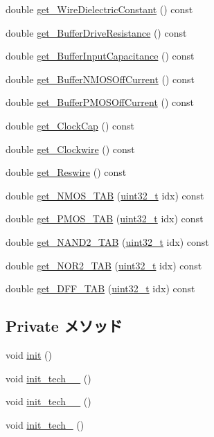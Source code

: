\begin{DoxyCompactItemize}
\item 
double \hyperlink{classTechParameter_af0f67ba9e156d60b46f1d83cc6d810d0}{get\_\-WireDielectricConstant} () const 
\item 
double \hyperlink{classTechParameter_afbf3915cdc33b808b8ad9c5afb71516a}{get\_\-BufferDriveResistance} () const 
\item 
double \hyperlink{classTechParameter_ac94ae59a7943a65a6e9868383e6bea27}{get\_\-BufferInputCapacitance} () const 
\item 
double \hyperlink{classTechParameter_aa1fbae5d74eb92a1a9c72a6fea9ca77f}{get\_\-BufferNMOSOffCurrent} () const 
\item 
double \hyperlink{classTechParameter_a30d0632ddefd780bb1bc6a0e9e5c0150}{get\_\-BufferPMOSOffCurrent} () const 
\item 
double \hyperlink{classTechParameter_afe4962e1a5669da514758a38434b84d8}{get\_\-ClockCap} () const 
\item 
double \hyperlink{classTechParameter_a013a3ecc42b046840eef9bef4c98081a}{get\_\-Clockwire} () const 
\item 
double \hyperlink{classTechParameter_a4f5da329c1d512ec23a66c4f0640fb9d}{get\_\-Reswire} () const 
\item 
double \hyperlink{classTechParameter_ad11303547538a05bd16a786162cf6f21}{get\_\-NMOS\_\-TAB} (\hyperlink{Type_8hh_a435d1572bf3f880d55459d9805097f62}{uint32\_\-t} idx) const 
\item 
double \hyperlink{classTechParameter_ac30923485e8060838bf0e23c152aa3d6}{get\_\-PMOS\_\-TAB} (\hyperlink{Type_8hh_a435d1572bf3f880d55459d9805097f62}{uint32\_\-t} idx) const 
\item 
double \hyperlink{classTechParameter_ad62c0a5630b13d0a9c4cbfe5bb9404d5}{get\_\-NAND2\_\-TAB} (\hyperlink{Type_8hh_a435d1572bf3f880d55459d9805097f62}{uint32\_\-t} idx) const 
\item 
double \hyperlink{classTechParameter_a88a118640a4fc2e7eba7825caebb6187}{get\_\-NOR2\_\-TAB} (\hyperlink{Type_8hh_a435d1572bf3f880d55459d9805097f62}{uint32\_\-t} idx) const 
\item 
double \hyperlink{classTechParameter_a34320956a27f781250cce6ad992d01d9}{get\_\-DFF\_\-TAB} (\hyperlink{Type_8hh_a435d1572bf3f880d55459d9805097f62}{uint32\_\-t} idx) const 
\end{DoxyCompactItemize}
\subsection*{Private メソッド}
\begin{DoxyCompactItemize}
\item 
void \hyperlink{classTechParameter_a02fd73d861ef2e4aabb38c0c9ff82947}{init} ()
\item 
void \hyperlink{classTechParameter_ac3246eb08ab7475baa739b641dbb3c92}{init\_\-tech\_\_} ()
\item 
void \hyperlink{classTechParameter_a2309fd1d1526cfd38d60ddb5f67b26c0}{init\_\-tech\_\_} ()
\item 
void \hyperlink{classTechParameter_a1c8669d2c75c4b1b2a1ddcf7ea6452aa}{init\_\-tech\_} ()
\end{DoxyCompactItemize}
